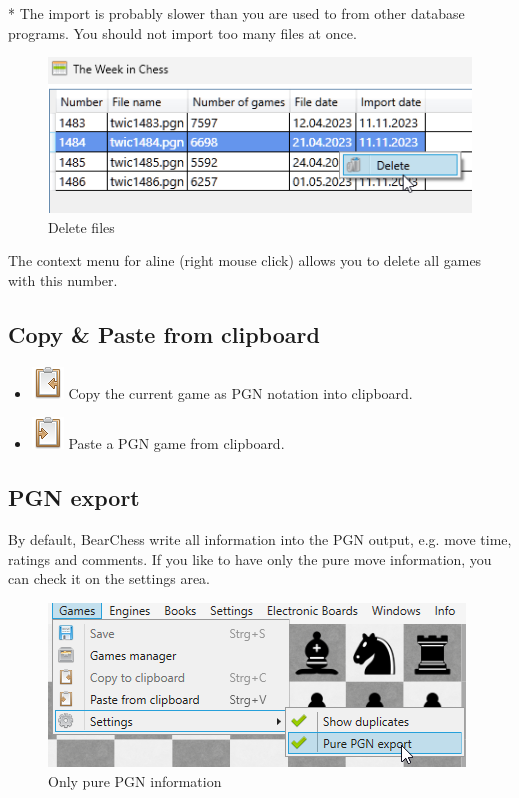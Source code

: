 \documentclass[11pt,a4paper]{article}
\begin{document}
{\color{red}*} The import is probably slower than you are used to from other database programs. You should not import too many files at once.


\begin{figure}[H]
	\centering
	\includegraphics[scale=0.8]{twic3.png}
	\caption{Delete files}
	\label{fig:TWIC3}
\end{figure}
The context menu for aline (right mouse click) allows you to delete all games with this number.


\subsection{Copy \& Paste from clipboard}

\begin{itemize}
	\item \includegraphics[scale=0.5]{clipboard_sign_out.png} Copy the current game as PGN notation into clipboard.
	\item \includegraphics[scale=0.5]{clipboard_sign.png} Paste a PGN game from clipboard.
	
\end{itemize}

\subsection{PGN export}
By default, BearChess write all information into the PGN output, e.g. move time, ratings and comments. If you like to have only the pure move information, you can check it on the settings area.
\begin{figure}[H]
	\centering
	\includegraphics[scale=0.8]{Games8.png}
	\caption{Only pure PGN information}
	\label{fig:Games8}
\end{figure}
\end{document}
